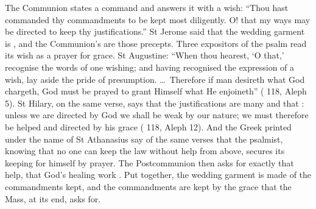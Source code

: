 The Communion states a command and answers it with a wish: ``Thou hast
commanded thy commandments to be kept most diligently. O! that my ways may be
directed to keep thy justifications.'' St Jerome said that the wedding garment
is , and the Communion's  are those
precepts. Three expositors of the psalm read its wish as a prayer for grace.
St Augustine: ``When thou hearest, `O that,' recognise the words of one
wishing; and having recognised the expression of a wish, lay aside the pride of
presumption. \dots\ Therefore if man desireth what God chargeth, God must be
prayed to grant Himself what He enjoineth'' ( 118, Aleph 5).
St Hilary, on the same verse, says that the justifications are many and that
: unless we are directed by God we
shall be weak by our nature; we must therefore be helped and directed by his
grace ( 118, Aleph 12). And the Greek
 printed under the name of St Athanasius say of
the same verses that the psalmist, knowing that no one can keep the law without
help from above, secures its keeping for himself by prayer. The Postcommunion
then asks for exactly that help, that God's healing work . Put together, the wedding garment is made of the
commandments kept, and the commandments are kept by the grace that the Mass,
at its end, asks for.

